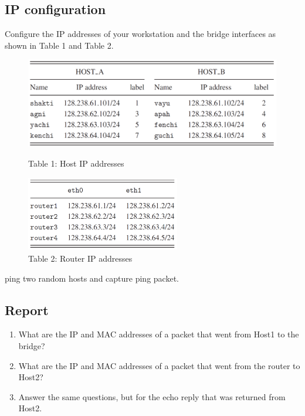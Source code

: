 \documentclass[10pt,a4paper]{article}
\numberwithin{equation}{section}
\numberwithin{figure}{section}
\numberwithin{table}{section}
\begin{document}
\subsection{IP configuration}
    Configure the IP addresses of your workstation and the bridge interfaces as shown in Table 1 and Table 2.\\

    \begin{figure}[H]
        \centering
        \includegraphics[width=\textwidth]{img/table1.png}
        \caption{Table 1: Host IP addresses}
        \label{tbl:table1}
        \includegraphics[width=0.6\textwidth]{img/table2.png}
        \caption{Table 2: Router IP addresses}
        \label{tbl:table2}
    \end{figure}

    ping two random hosts and capture ping packet.		

    \subsection*{Report}
    \begin{enumerate}
        \item What are the IP and MAC addresses of a packet that went from Host1 to the bridge? 
        \item What are the IP and MAC addresses of a packet that went from the router to Host2?
        \item Answer the same questions, but for the echo reply that was returned from Host2.
    \end{enumerate}

    
\end{document}
